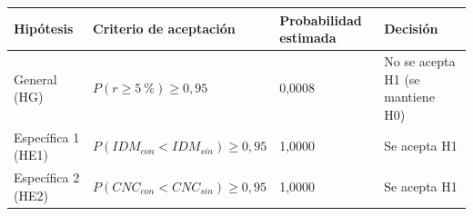 \begin{tabularx}{\linewidth}{@{}P{2.2cm}LP{2.6cm}P{3.6cm}@{}}
\toprule
\textbf{Hipótesis} & \textbf{Criterio de aceptación} & \textbf{Probabilidad estimada} & \textbf{Decisión} \\
\midrule
General (HG) & $P(r \geq 5~\%) \geq 0,95$ & 0,0008 & No se acepta H1 (se mantiene H0) \\
Específica 1 (HE1) & $P(IDM_{con} < IDM_{sin}) \geq 0,95$ & 1,0000 & Se acepta H1 \\
Específica 2 (HE2) & $P(CNC_{con} < CNC_{sin}) \geq 0,95$ & 1,0000 & Se acepta H1 \\
\bottomrule
\end{tabularx}

